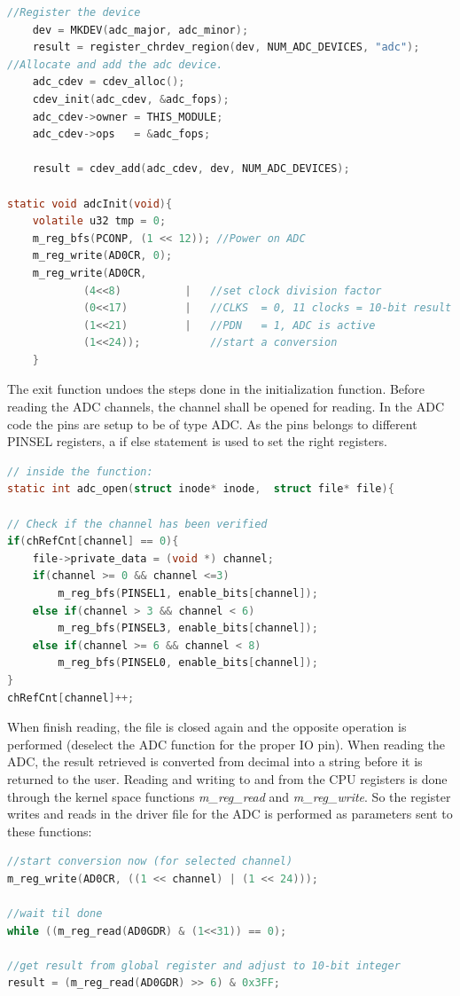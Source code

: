 \begin{lstlisting}[language=c]
//Register the device
	dev = MKDEV(adc_major, adc_minor);
	result = register_chrdev_region(dev, NUM_ADC_DEVICES, "adc");
//Allocate and add the adc device.
	adc_cdev = cdev_alloc();
	cdev_init(adc_cdev, &adc_fops);
	adc_cdev->owner = THIS_MODULE;
	adc_cdev->ops   = &adc_fops;

	result = cdev_add(adc_cdev, dev, NUM_ADC_DEVICES);
	
static void adcInit(void){
	volatile u32 tmp = 0;
	m_reg_bfs(PCONP, (1 << 12)); //Power on ADC
	m_reg_write(AD0CR, 0);
	m_reg_write(AD0CR,
			(4<<8)			|	//set clock division factor
			(0<<17)			|	//CLKS  = 0, 11 clocks = 10-bit result
			(1<<21)			|	//PDN   = 1, ADC is active
			(1<<24));			//start a conversion
	}
\end{lstlisting}
The exit function undoes the steps done in the initialization function.
\p Before reading the ADC channels, the channel shall be opened for reading. In the ADC code the pins are setup to be of type ADC. As the pins belongs to different PINSEL registers, a if else statement is used to set the right registers.
\begin{lstlisting}[language=c]
// inside the function: 
static int adc_open(struct inode* inode,  struct file* file){

// Check if the channel has been verified
if(chRefCnt[channel] == 0){
	file->private_data = (void *) channel;
	if(channel >= 0 && channel <=3)
		m_reg_bfs(PINSEL1, enable_bits[channel]);
	else if(channel > 3 && channel < 6)
		m_reg_bfs(PINSEL3, enable_bits[channel]);
	else if(channel >= 6 && channel < 8)
		m_reg_bfs(PINSEL0, enable_bits[channel]);
}
chRefCnt[channel]++;
\end{lstlisting}
When finish reading, the file is closed again and the opposite operation is performed (deselect the ADC function for the proper IO pin).
\p When reading the ADC, the result retrieved is converted from decimal into a string before it is returned to the user. Reading and writing to and from the CPU registers is done through the kernel space functions \textit{m\_reg\_read} and \textit{m\_reg\_write}. So the register writes and reads in the driver file for the ADC is performed as parameters sent to these functions:
\begin{lstlisting}[language=c]
//start conversion now (for selected channel)
m_reg_write(AD0CR, ((1 << channel) | (1 << 24)));

//wait til done
while ((m_reg_read(AD0GDR) & (1<<31)) == 0);

//get result from global register and adjust to 10-bit integer
result = (m_reg_read(AD0GDR) >> 6) & 0x3FF;
\end{lstlisting}

